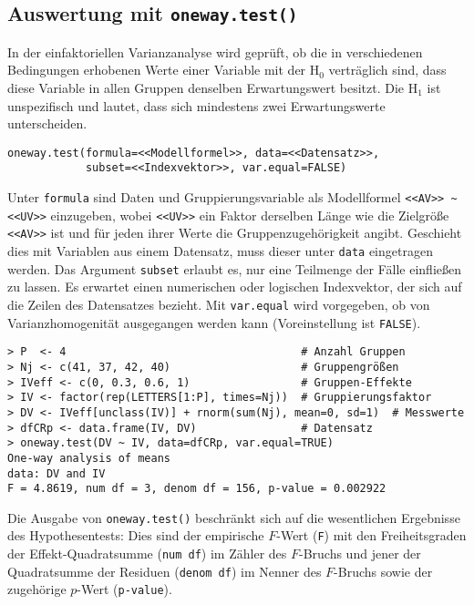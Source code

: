 \subsection{Auswertung mit \texttt{oneway.test()}}
\label{sec:oneway}

In der einfaktoriellen Varianzanalyse wird geprüft, ob die in verschiedenen Bedingungen erhobenen Werte einer Variable mit der $\text{H}_{0}$ verträglich sind, dass diese Variable in allen Gruppen denselben Erwartungswert besitzt. Die $\text{H}_{1}$ ist unspezifisch und lautet, dass sich mindestens zwei Erwartungswerte unterscheiden.
\begin{lstlisting}
oneway.test(formula=<<Modellformel>>, data=<<Datensatz>>,
            subset=<<Indexvektor>>, var.equal=FALSE)
\end{lstlisting}

Unter \lstinline!formula! sind Daten und Gruppierungsvariable als Modellformel \lstinline!<<AV>> ~ <<UV>>! einzugeben, wobei \lstinline!<<UV>>! ein Faktor derselben Länge wie die Zielgröße \lstinline!<<AV>>! ist und für jeden ihrer Werte die Gruppenzugehörigkeit angibt. Geschieht dies mit Variablen aus einem Datensatz, muss dieser unter \lstinline!data! eingetragen werden. Das Argument \lstinline!subset! erlaubt es, nur eine Teilmenge der Fälle einfließen zu lassen. Es erwartet einen numerischen oder logischen Indexvektor, der sich auf die Zeilen des Datensatzes bezieht. Mit \lstinline!var.equal! wird vorgegeben, ob von Varianzhomogenität ausgegangen werden kann (Voreinstellung ist \lstinline!FALSE!).
\begin{lstlisting}
> P  <- 4                                    # Anzahl Gruppen
> Nj <- c(41, 37, 42, 40)                    # Gruppengrößen
> IVeff <- c(0, 0.3, 0.6, 1)                 # Gruppen-Effekte
> IV <- factor(rep(LETTERS[1:P], times=Nj))  # Gruppierungsfaktor
> DV <- IVeff[unclass(IV)] + rnorm(sum(Nj), mean=0, sd=1)  # Messwerte
> dfCRp <- data.frame(IV, DV)                # Datensatz
> oneway.test(DV ~ IV, data=dfCRp, var.equal=TRUE)
One-way analysis of means
data: DV and IV
F = 4.8619, num df = 3, denom df = 156, p-value = 0.002922
\end{lstlisting}

Die Ausgabe von \lstinline!oneway.test()! beschränkt sich auf die wesentlichen Ergebnisse des Hypothesentests: Dies sind der empirische $F$-Wert (\lstinline!F!) mit den Freiheitsgraden der Effekt-Quadratsumme (\lstinline!num df!) im Zähler des $F$-Bruchs und jener der Quadratsumme der Residuen (\lstinline!denom df!) im Nenner des $F$-Bruchs sowie der zugehörige $p$-Wert (\lstinline!p-value!).

